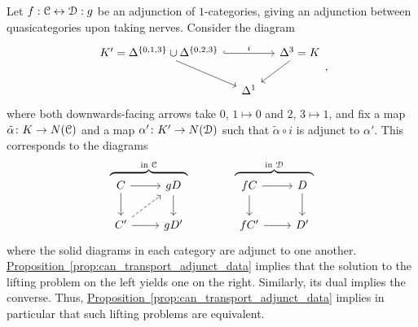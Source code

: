 \documentclass[main.tex]{subfiles}
\begin{document}
\begin{example}
  Let $f : \mathcal{C} \leftrightarrow \mathcal{D} : g$ be an adjunction of $1$-categories, giving an adjunction between quasicategories upon taking nerves. Consider the diagram
  \begin{equation*}
    \begin{tikzcd}[column sep=small]
      K' = \Delta^{\{0,1,3\}} \cup \Delta^{\{0,2,3\}}
      \arrow[dr]
      \arrow[rr, hook, "i"]
      && \Delta^{3} = K
      \arrow[dl]
      \\
      & \Delta^{1}
    \end{tikzcd},
  \end{equation*}
  where both downwards-facing arrows take $0$, $1 \mapsto 0$ and $2$, $3 \mapsto 1$, and fix a map $\tilde{\alpha}\colon K \to N(\mathcal{C})$ and a map $\alpha'\colon K' \to N(\mathcal{D})$ such that $\tilde{\alpha} \circ i$ is adjunct to $\alpha'$. This corresponds to the diagrams
  \begin{equation*}
    \overbrace{
      \begin{tikzcd}[ampersand replacement=\&]
        C
        \arrow[r]
        \arrow[d]
        \& gD
        \arrow[d]
        \\
        C'
        \arrow[r]
        \arrow[ur, dashed]
        \& gD'
      \end{tikzcd}
    }^{\text{in } \category{C}}
    \qquad\qquad
    \overbrace{\begin{tikzcd}[ampersand replacement=\&]
      fC
      \arrow[r]
      \arrow[d]
      \& D
      \arrow[d]
      \\
      fC'
      \arrow[r]
      \& D'
    \end{tikzcd}}^{\text{in }\category{D}}
  \end{equation*}
  where the solid diagrams in each category are adjunct to one another.
  \hyperref[prop:can_transport_adjunct_data]{Proposition~\ref*{prop:can_transport_adjunct_data}} implies that the solution to the lifting problem on the left yields one on the right. Similarly, its dual implies the converse. Thus, \hyperref[prop:can_transport_adjunct_data]{Proposition~\ref*{prop:can_transport_adjunct_data}} implies in particular that such lifting problems are equivalent.
\end{example}
\end{document}
